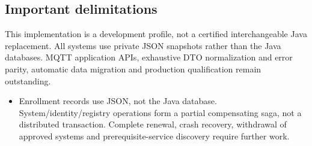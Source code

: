 \documentclass[a4paper]{arrowhead}
\begin{document}
\subsection{Important delimitations}
This implementation is a development profile, not a certified interchangeable Java replacement. All systems use private JSON snapshots rather than the Java databases. MQTT application APIs, exhaustive DTO normalization and error parity, automatic data migration and production qualification remain outstanding.
\begin{itemize}
\item Enrollment records use JSON, not the Java database. System/identity/registry operations form a partial compensating saga, not a distributed transaction. Complete renewal, crash recovery, withdrawal of approved systems and prerequisite-service discovery require further work.
\end{itemize}
\end{document}
